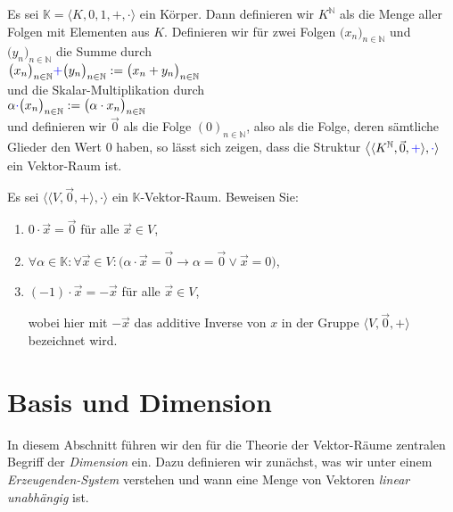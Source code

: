 \example
Es sei $\mathbb{K} = \langle K, 0,1,+,\cdot\rangle$ ein K\"{o}rper.  Dann definieren wir $K^\mathbb{N}$ als die Menge aller
Folgen mit Elementen aus $K$.  Definieren wir f\"{u}r zwei
Folgen
$\bigl(x_n\bigr)_{n\in\mathbb{N}}$ und $\bigl(y_n\bigr)_{n\in\mathbb{N}}$ die Summe durch
\\[0.2cm]
\hspace*{1.3cm}
$\bigl(x_n\bigr)_{n\in\mathbb{N}} {\color{blue}{+}} \bigl(y_n\bigr)_{n\in\mathbb{N}} := \bigl(x_n + y_n\bigr)_{n\in\mathbb{N}}$ 
\\[0.2cm]
und die Skalar-Multiplikation durch
\\[0.2cm]
\hspace*{1.3cm}
$\alpha {\color{blue}{\cdot}} \bigl(x_n\bigr)_{n\in\mathbb{N}} := \bigl(\alpha \cdot x_n \bigr)_{n\in\mathbb{N}}$
\\[0.2cm]
und definieren wir $\vec{0}$ als die Folge $(0)_{n\in\mathbb{N}}$, also als die Folge,
deren s\"{a}mtliche Glieder den Wert $0$ haben, so l\"{a}sst sich zeigen, dass die Struktur
 $\bigl\langle\langle K^\mathbb{N}, \vec{0}, {\color{blue}{+}}\rangle, {\color{blue}{\cdot}}\rangle$  ein Vektor-Raum ist.
\eoxs


\exercise
Es sei $\bigl\langle \langle V, \vec{0}, +\rangle, \cdot\bigr\rangle$ ein $\mathbb{K}$-Vektor-Raum.  Beweisen Sie:
\renewcommand{\labelenumi}{(\alph{enumi})}
\begin{enumerate}
\item $0 \cdot \vec{x} = \vec{0}$ \quad f\"ur alle $\vec{x} \in V$,
\item $\forall \alpha \in \mathbb{K}: \forall \vec{x} \in V: \bigl(\alpha \cdot \vec{x} = \vec{0} \rightarrow \alpha = \vec{0} \vee \vec{x} = 0\bigr)$,
\item $(-1) \cdot \vec{x} = -\vec{x}$ \quad f\"ur alle $\vec{x} \in V$,

      wobei hier mit $-\vec{x}$ das additive Inverse von $x$ in der Gruppe $\langle V, \vec{0}, +\rangle$
      bezeichnet wird. 
      \eoxs
\end{enumerate}
\renewcommand{\labelenumi}{\arabic{enumi}.}

\section{Basis und Dimension}
In diesem Abschnitt f\"{u}hren wir den f\"{u}r die Theorie der Vektor-R\"{a}ume zentralen Begriff
der {\emph{\color{blue}Dimension}}
ein.  Dazu definieren wir zun\"{a}chst, was wir unter einem {\emph{\color{blue}Erzeugenden-System}}
verstehen und wann eine Menge von Vektoren {\emph{\color{blue}linear unabh\"{a}ngig}} ist.


